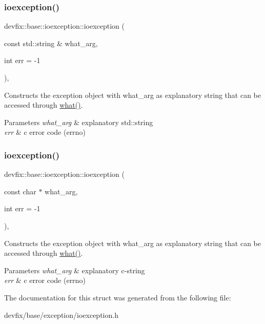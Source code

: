 \subsubsection{\texorpdfstring{ioexception()}{ioexception()}\hspace{0.1cm}{\footnotesize\ttfamily [1/2]}}
{\footnotesize\ttfamily devfix\+::base\+::ioexception\+::ioexception (\begin{DoxyParamCaption}\item[{const std\+::string \&}]{what\+\_\+arg,  }\item[{int}]{err = {\ttfamily -\/1} }\end{DoxyParamCaption})\hspace{0.3cm}{\ttfamily [inline]}, {\ttfamily [explicit]}}

Constructs the exception object with what\+\_\+arg as explanatory string that can be accessed through \hyperlink{structdevfix_1_1base_1_1baseexception_a10cc739c08d7d38b89abea342824396f}{what()}. 
\begin{DoxyParams}{Parameters}
{\em what\+\_\+arg} & explanatory std\+::string \\
\hline
{\em err} & c error code (errno) \\
\hline
\end{DoxyParams}
\mbox{\label{structdevfix_1_1base_1_1ioexception_a7e9cd8711bd28715fe16de909b750c33}} 
\subsubsection{\texorpdfstring{ioexception()}{ioexception()}\hspace{0.1cm}{\footnotesize\ttfamily [2/2]}}
{\footnotesize\ttfamily devfix\+::base\+::ioexception\+::ioexception (\begin{DoxyParamCaption}\item[{const char $\ast$}]{what\+\_\+arg,  }\item[{int}]{err = {\ttfamily -\/1} }\end{DoxyParamCaption})\hspace{0.3cm}{\ttfamily [inline]}, {\ttfamily [explicit]}}

Constructs the exception object with what\+\_\+arg as explanatory string that can be accessed through \hyperlink{structdevfix_1_1base_1_1baseexception_a10cc739c08d7d38b89abea342824396f}{what()}. 
\begin{DoxyParams}{Parameters}
{\em what\+\_\+arg} & explanatory c-\/string \\
\hline
{\em err} & c error code (errno) \\
\hline
\end{DoxyParams}


The documentation for this struct was generated from the following file\+:\begin{DoxyCompactItemize}
\item 
devfix/base/exception/ioexception.\+h\end{DoxyCompactItemize}
